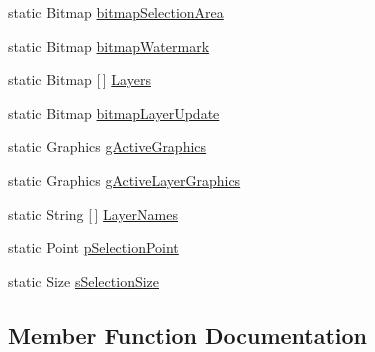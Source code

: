 \begin{DoxyCompactItemize}
\item 
static Bitmap \mbox{\hyperlink{class_paint___program_1_1_shared_settings_a27bbcaa8ec082334c2d588d787d01b35}{bitmap\+Selection\+Area}}
\item 
static Bitmap \mbox{\hyperlink{class_paint___program_1_1_shared_settings_a4a39cd815c080f8655aa58963232d012}{bitmap\+Watermark}}
\item 
static Bitmap \mbox{[}$\,$\mbox{]} \mbox{\hyperlink{class_paint___program_1_1_shared_settings_a5e9b319f08346ef4c39dd00b81ea9f52}{Layers}}
\item 
static Bitmap \mbox{\hyperlink{class_paint___program_1_1_shared_settings_a8559066346da3f32d3fea4a243cdc752}{bitmap\+Layer\+Update}}
\item 
static Graphics \mbox{\hyperlink{class_paint___program_1_1_shared_settings_a73de02ec254a6faca27e37e1dc081ff6}{g\+Active\+Graphics}}
\item 
static Graphics \mbox{\hyperlink{class_paint___program_1_1_shared_settings_a3433ccca602272dc6a644d7087cbcada}{g\+Active\+Layer\+Graphics}}
\item 
static String \mbox{[}$\,$\mbox{]} \mbox{\hyperlink{class_paint___program_1_1_shared_settings_a89341bdff39c4db7de11339ad8ae96e0}{Layer\+Names}}
\item 
static Point \mbox{\hyperlink{class_paint___program_1_1_shared_settings_a8d246d75ca83dab4a58203fef2f84f5c}{p\+Selection\+Point}}
\item 
static Size \mbox{\hyperlink{class_paint___program_1_1_shared_settings_ac35e2926620b0adf8a15b516623d73ac}{s\+Selection\+Size}}
\end{DoxyCompactItemize}


\subsection{Member Function Documentation}
\mbox{\label{class_paint___program_1_1_shared_settings_a9d0c5bb676b27571cb09eb2084080c47}} 
